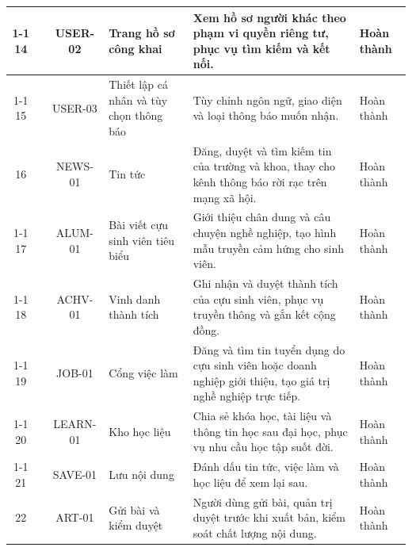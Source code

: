 \documentclass[12pt,a4paper,oneside]{report}
\begin{document}
\begin{landscape}
\begin{longtable}{|c|>{\raggedright\arraybackslash}p{3.1cm}|c|>{\raggedright\arraybackslash}p{4.6cm}|>{\raggedright\arraybackslash}p{8.4cm}|>{\raggedright\arraybackslash}p{2.4cm}|}
\cline{1-1}\cline{3-6}
\cellcolor{oldrow}14 & \cellcolor{oldrow} & \cellcolor{oldrow}USER-02 & \cellcolor{oldrow}Trang hồ sơ công khai & \cellcolor{oldrow}Xem hồ sơ người khác theo phạm vi quyền riêng tư, phục vụ tìm kiếm và kết nối. & \cellcolor{oldrow}Hoàn thành \\
\cline{1-1}\cline{3-6}
\cellcolor{oldrow}15 & \multirow{-3}{2.4cm}{\cellcolor{oldrow}\textbf{Hồ sơ người dùng}} & \cellcolor{oldrow}USER-03 & \cellcolor{oldrow}Thiết lập cá nhân và tùy chọn thông báo & \cellcolor{oldrow}Tùy chỉnh ngôn ngữ, giao diện và loại thông báo muốn nhận. & \cellcolor{oldrow}Hoàn thành \\
\hline
\cellcolor{oldrow}16 & \cellcolor{oldrow} & \cellcolor{oldrow}NEWS-01 & \cellcolor{oldrow}Tin tức & \cellcolor{oldrow}Đăng, duyệt và tìm kiếm tin của trường và khoa, thay cho kênh thông báo rời rạc trên mạng xã hội. & \cellcolor{oldrow}Hoàn thành \\
\cline{1-1}\cline{3-6}
\cellcolor{oldrow}17 & \cellcolor{oldrow} & \cellcolor{oldrow}ALUM-01 & \cellcolor{oldrow}Bài viết cựu sinh viên tiêu biểu & \cellcolor{oldrow}Giới thiệu chân dung và câu chuyện nghề nghiệp, tạo hình mẫu truyền cảm hứng cho sinh viên. & \cellcolor{oldrow}Hoàn thành \\
\cline{1-1}\cline{3-6}
\cellcolor{oldrow}18 & \cellcolor{oldrow} & \cellcolor{oldrow}ACHV-01 & \cellcolor{oldrow}Vinh danh thành tích & \cellcolor{oldrow}Ghi nhận và duyệt thành tích của cựu sinh viên, phục vụ truyền thông và gắn kết cộng đồng. & \cellcolor{oldrow}Hoàn thành \\
\cline{1-1}\cline{3-6}
\cellcolor{oldrow}19 & \cellcolor{oldrow} & \cellcolor{oldrow}JOB-01 & \cellcolor{oldrow}Cổng việc làm & \cellcolor{oldrow}Đăng và tìm tin tuyển dụng do cựu sinh viên hoặc doanh nghiệp giới thiệu, tạo giá trị nghề nghiệp trực tiếp. & \cellcolor{oldrow}Hoàn thành \\
\cline{1-1}\cline{3-6}
\cellcolor{oldrow}20 & \cellcolor{oldrow} & \cellcolor{oldrow}LEARN-01 & \cellcolor{oldrow}Kho học liệu & \cellcolor{oldrow}Chia sẻ khóa học, tài liệu và thông tin học sau đại học, phục vụ nhu cầu học tập suốt đời. & \cellcolor{oldrow}Hoàn thành \\
\cline{1-1}\cline{3-6}
\cellcolor{oldrow}21 & \multirow{-6}{2.4cm}{\cellcolor{oldrow}\textbf{Nội dung và việc làm}} & \cellcolor{oldrow}SAVE-01 & \cellcolor{oldrow}Lưu nội dung & \cellcolor{oldrow}Đánh dấu tin tức, việc làm và học liệu để xem lại sau. & \cellcolor{oldrow}Hoàn thành \\
\hline
\cellcolor{oldrow}22 & \cellcolor{oldrow} & \cellcolor{oldrow}ART-01 & \cellcolor{oldrow}Gửi bài và kiểm duyệt & \cellcolor{oldrow}Người dùng gửi bài, quản trị duyệt trước khi xuất bản, kiểm soát chất lượng nội dung. & \cellcolor{oldrow}Hoàn thành \\

\end{longtable}
\end{landscape}
\end{document}
